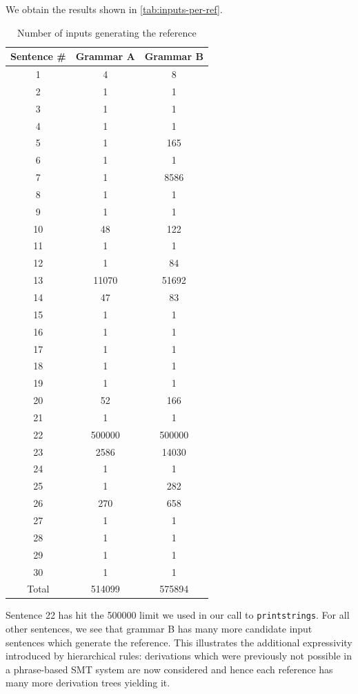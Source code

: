 \documentclass[a4paper,oneside,reqno]{amsart}
\begin{document}
\begin{enumerate}[label=\arabic*.]
    We obtain the results shown in \autoref{tab:inputs-per-ref}.
    \begin{table}[h]
      \begin{tabular}{ccc}
        \toprule
        Sentence \# & Grammar A & Grammar B \\
        \midrule
        1 & 4     & 8       \\
        2 & 1     & 1       \\
        3 & 1     & 1       \\
        4 & 1     & 1       \\
        5 & 1     & 165     \\
        6 & 1     & 1       \\
        7 & 1     & 8586    \\
        8 & 1     & 1       \\
        9 & 1     & 1       \\
        10& 48    & 122     \\
        11& 1     & 1       \\
        12& 1     & 84      \\
        13& 11070 & 51692   \\
        14& 47    & 83      \\
        15& 1     & 1       \\
        16& 1     & 1       \\
        17& 1     & 1       \\
        18& 1     & 1       \\
        19& 1     & 1       \\
        20& 52    & 166     \\
        21& 1     & 1       \\
        22& 500000& 500000  \\
        23& 2586  & 14030   \\
        24& 1     & 1       \\
        25& 1     & 282     \\
        26& 270   & 658     \\
        27& 1     & 1       \\
        28& 1     & 1       \\
        29& 1     & 1       \\
        30& 1     & 1       \\
        \hline
        Total & 514099 & 575894\\
        \bottomrule
      \end{tabular}
      \caption{Number of inputs generating the reference}
      \label{tab:inputs-per-ref}
    \end{table}
    Sentence 22 has hit the 500000 limit we used in our call to
    \texttt{printstrings}.  For all other sentences, we see that grammar B has
    many more candidate input sentences which generate the reference. This
    illustrates the additional expressivity introduced by hierarchical rules:
    derivations which were previously not possible in a phrase-based SMT system
    are now considered and hence each reference has many more derivation trees
    yielding it.


\end{enumerate}
\end{document}
